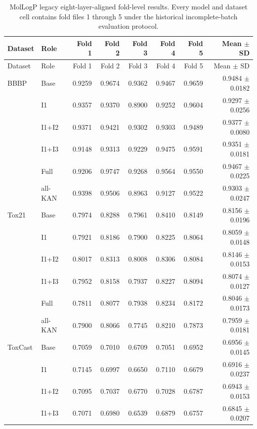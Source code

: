 \documentclass[journal=jcisd8,manuscript=article]{achemso}
\begin{document}
\begin{landscape}
\begin{longtable}{llrrrrrr}
\caption{MolLogP legacy eight-layer-aligned fold-level results. Every model and dataset cell contains fold files 1 through 5 under the historical incomplete-batch evaluation protocol.}
\label{tab:si-logp-fold-results}\\
\toprule
Dataset & Role & Fold 1 & Fold 2 & Fold 3 & Fold 4 & Fold 5 & Mean $\pm$ SD \\
\midrule
\endfirsthead
\toprule
Dataset & Role & Fold 1 & Fold 2 & Fold 3 & Fold 4 & Fold 5 & Mean $\pm$ SD \\
\midrule
\endhead
BBBP & Base & 0.9259 & 0.9674 & 0.9362 & 0.9467 & 0.9659 & 0.9484 $\pm$ 0.0182 \\
 & I1 & 0.9357 & 0.9370 & 0.8900 & 0.9252 & 0.9604 & 0.9297 $\pm$ 0.0256 \\
 & I1+I2 & 0.9371 & 0.9421 & 0.9302 & 0.9303 & 0.9489 & 0.9377 $\pm$ 0.0080 \\
 & I1+I3 & 0.9148 & 0.9313 & 0.9229 & 0.9475 & 0.9591 & 0.9351 $\pm$ 0.0181 \\
 & Full & 0.9206 & 0.9747 & 0.9268 & 0.9564 & 0.9550 & 0.9467 $\pm$ 0.0225 \\
 & all-KAN & 0.9398 & 0.9506 & 0.8963 & 0.9127 & 0.9522 & 0.9303 $\pm$ 0.0247 \\
\midrule
Tox21 & Base & 0.7974 & 0.8288 & 0.7961 & 0.8410 & 0.8149 & 0.8156 $\pm$ 0.0196 \\
 & I1 & 0.7921 & 0.8186 & 0.7900 & 0.8225 & 0.8064 & 0.8059 $\pm$ 0.0148 \\
 & I1+I2 & 0.8017 & 0.8313 & 0.8008 & 0.8306 & 0.8084 & 0.8146 $\pm$ 0.0153 \\
 & I1+I3 & 0.7952 & 0.8158 & 0.7937 & 0.8227 & 0.8094 & 0.8074 $\pm$ 0.0127 \\
 & Full & 0.7811 & 0.8077 & 0.7938 & 0.8234 & 0.8172 & 0.8046 $\pm$ 0.0173 \\
 & all-KAN & 0.7900 & 0.8066 & 0.7745 & 0.8210 & 0.7873 & 0.7959 $\pm$ 0.0181 \\
\midrule
ToxCast & Base & 0.7059 & 0.7010 & 0.6709 & 0.7051 & 0.6952 & 0.6956 $\pm$ 0.0145 \\
 & I1 & 0.7145 & 0.6997 & 0.6650 & 0.7110 & 0.6679 & 0.6916 $\pm$ 0.0237 \\
 & I1+I2 & 0.7095 & 0.7037 & 0.6770 & 0.7028 & 0.6787 & 0.6943 $\pm$ 0.0153 \\
 & I1+I3 & 0.7071 & 0.6980 & 0.6539 & 0.6879 & 0.6757 & 0.6845 $\pm$ 0.0207 \\

\end{longtable}
\end{landscape}
\end{document}
